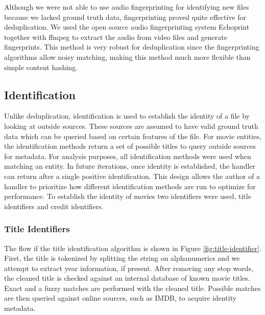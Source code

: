 \documentclass[paper=a4, fontsize=11pt]{scrartcl} %
\numberwithin{equation}{section} %
\numberwithin{figure}{section} %
\numberwithin{table}{section} %
\begin{document}
Although we were not able to use audio fingerprinting for identifying new files because we lacked ground truth data, fingerprinting proved quite effective for deduplication. We used the open source audio fingerprinting system Echoprint together with ffmpeg to extract the audio from video files and generate fingerprints. This method is very robust for deduplication since the fingerprinting algorithms allow noisy matching, making this method much more flexible than simple content hashing. \\



\subsection{Identification}
\label{sec:identification}
Unlike deduplication, identification is used to establish the identity of a file by looking at outside sources. These sources are assumed to have valid ground truth data which can be queried based on certain features of the file. For movie entities, the identification methods return a set of possible titles to query outside sources for metadata. For analysis purposes, all identification methods were used when matching an entity. In future iterations, once identity is established, the handler can return after a single positive identification. This design allows the author of a handler to prioritize how different identification methods are run to optimize for performance. To establish the identity of movies two identifiers were used, title identifiers and credit identifiers. \\

\subsubsection{Title Identifiers}
\label{sec:title-identifier}

The flow if the title identification algorithm is shown in Figure \ref{fig:title-identifier}. First, the title is tokenized by splitting the string on alphanumerics and we attempt to extract year information, if present. After removing any stop words, the cleaned title is checked against an internal database of known movie titles. Exact and a fuzzy matches are performed with the cleaned title. Possible matches are then queried against online sources, such as IMDB, to acquire identity metadata. \\
\end{document}
